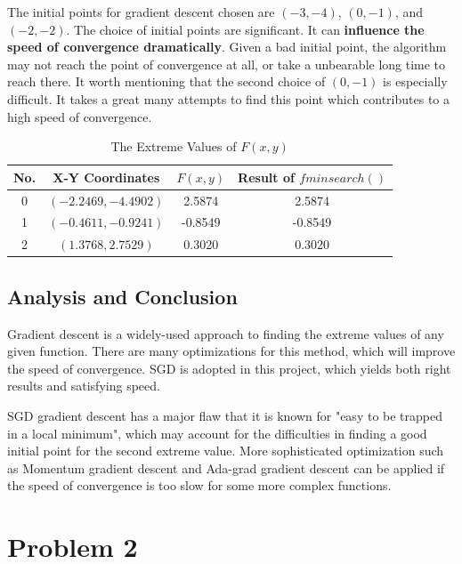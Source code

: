 \documentclass[12pt]{article}
\begin{document}
The initial points for gradient descent chosen are $(-3,-4)$, $(0,-1)$, and $(-2,-2)$. The choice of initial points are significant. It can \textbf{influence the speed of convergence dramatically}. Given a bad initial point, the algorithm may not reach the point of convergence at all, or take a unbearable long time to reach there. It worth mentioning that the second choice of $(0,-1)$ is especially difficult. It takes a great many attempts to find this point which contributes to a high speed of convergence.


\begin{table}[h]
	\caption{The Extreme Values of $F(x,y)$}
	\begin{center}
		\begin{tabular}{|c|c|c|c|}
			\hline
			No. & X-Y Coordinates & $F(x,y)$ & Result of $fminsearch()$ \\ \hline
			0 & $(-2.2469,-4.4902)$ & 2.5874 &  2.5874 \\ \hline
			1 & $(-0.4611,-0.9241)$ & -0.8549 & -0.8549 \\ \hline
			2 & $(1.3768,2.7529)$ & 0.3020 & 0.3020 \\ \hline
		\end{tabular}
	\end{center}
	\label{table:p1result}
\end{table}

\subsection{Analysis and Conclusion}   
  

Gradient descent is a widely-used approach to finding the extreme values of any given function. There are many optimizations for this method, which will improve the speed of convergence. SGD is adopted in this project, which yields both right results and satisfying speed.

SGD gradient descent has a major flaw that it is known for "easy to be trapped in a local minimum", which may account for the difficulties in finding a good initial point for the second extreme value. More sophisticated optimization such as Momentum gradient descent and Ada-grad gradient descent can be applied if the speed of convergence is too slow for some more complex functions.


\section{Problem 2}
\end{document}
